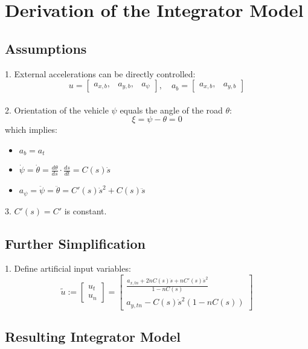 \chapter{Derivation of the Integrator Model} \label{ch:der_int_mod}

\section{Assumptions}

1. External accelerations can be directly controlled:
\begin{equation}
	u = \begin{bmatrix} a_{x,b}, & a_{y,b}, & a_\psi \end{bmatrix}, \quad a_b = \begin{bmatrix} a_{x,b}, & a_{y,b} \end{bmatrix}
\end{equation}
\\
2. Orientation of the vehicle $\psi$ equals the angle of the road $\theta$:
\begin{equation}
	\xi = \psi - \theta = 0
\end{equation}
which implies:
\begin{itemize}
	\item $a_b = a_t$
	\item $\dot{\psi} = \dot{\theta} = \frac{d\theta}{ds} \cdot \frac{ds}{dt} = C(s)\dot{s}$
	\item $a_\psi = \ddot{\psi} = \ddot{\theta} = C'(s) \dot{s}^2 + C(s)\ddot{s}$
\end{itemize}
3. $C'(s) = C'$ is constant.

\section{Further Simplification}

1. Define artificial input variables:
\begin{equation}
	\tilde{u} :=
	\begin{bmatrix}
		u_t \\ u_n
	\end{bmatrix} =
	\begin{bmatrix}
		\frac{
			a_{x,tn} + 2\dot{n}C(s)\dot{s} + nC'(s)\dot{s}^2
		}{
			1 - nC(s)
		} \\
		a_{y,tn} - C(s)\dot{s}^2(1 - nC(s))
	\end{bmatrix}
\end{equation}

\section{Resulting Integrator Model}

